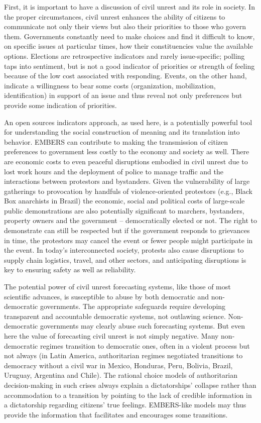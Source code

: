 \documentclass[11pt,a4paper,extrafontsizes,oneside]{article}
\begin{document}
First, it is important to have a discussion of civil unrest and its role in society.
In the proper circumstances,
civil unrest enhances the ability of citizens to communicate not only their views but also
their priorities to those who govern them. Governments constantly need to make choices and find
it difficult to know, on specific issues at particular times, how their constituencies value the available
options. Elections are retrospective indicators and rarely issue-specific; polling taps into sentiment,
but is not a good indicator of priorities or strength of feeling because of the
low cost associated with responding. Events, on the other hand, indicate a willingness to
bear some costs (organization, mobilization, identification) in support of an issue and
thus reveal not only preferences but provide some indication of priorities.

An open sources indicators approach, as used here, is a potentially powerful
tool for understanding the social construction of meaning and its translation into behavior.
EMBERS can contribute to making the transmission of citizen preferences to
government less costly to the economy and society as well. There are economic
costs to even peaceful disruptions embodied in civil unrest due to lost work
hours and the deployment of police to manage traffic and the interactions
between protestors and bystanders. Given the vulnerability of large gatherings
to provocation by handfuls of violence-oriented protestors (e.g., Black Box
anarchists in Brazil) the economic, social and political costs of
large-scale public demonstrations are also potentially significant to marchers, bystanders, property owners
and the government -- democratically elected or not. The right to demonstrate can still
be respected but if the government responds to grievances in time,
the protestors may cancel the event or fewer people might participate in the event.
In today's interconnected society, protests also cause disruptions to supply chain logistics, travel, and
other sectors, and anticipating disruptions is key to ensuring safety as well as reliability.

The potential power of civil unrest forecasting systems, like those
of most scientific advances, is susceptible to abuse by
both democratic and non-democratic governments. The appropriate safeguards require
developing transparent and accountable democratic systems, not outlawing science.
Non-democratic governments may clearly abuse such forecasting systems. But even
here the value of forecasting civil unrest is not simply negative. Many non-democratic regimes transition to democratic
ones, often in a violent process but not always (in Latin America, authoritarian regimes negotiated
transitions to democracy without a civil war in Mexico, Honduras, Peru, Bolivia, Brazil,
Uruguay, Argentina and Chile). The rational choice models of authoritarian decision-making in
such crises always explain a dictatorships’ collapse rather than accommodation to
a transition by pointing to the lack of credible information in
a dictatorship regarding citizens’ true feelings. EMBERS-like models may thus provide the
information that facilitates and encourages some transitions.
\end{document}
